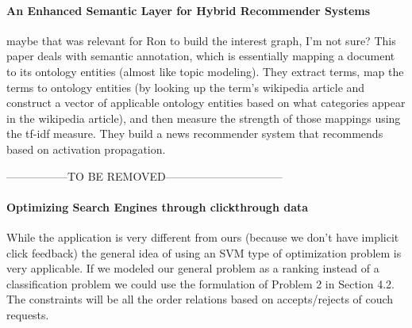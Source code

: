 \paragraph{An Enhanced Semantic Layer for Hybrid Recommender Systems} \cite{Cantador2011}
 maybe that was relevant for Ron to build the interest graph, I'm not sure?
This paper deals with semantic annotation, which is essentially mapping a document to its ontology entities (almost like topic modeling). They extract terms, map the terms to ontology entities (by looking up the term's wikipedia article and construct a vector of applicable ontology entities based on what categories appear in the wikipedia article), and then measure the strength of those mappings using the tf-idf measure.
They build a news recommender system that recommends based on activation propagation.


-----------------TO BE REMOVED--------------------------------

\paragraph{Optimizing Search Engines through clickthrough data} \cite{Joachims2002}
While the application is very different from ours (because we don't have implicit click feedback) the general idea of using an SVM type of optimization problem is very applicable.
If we modeled our general problem as a ranking instead of a classification problem we could use the formulation of Problem 2 in Section 4.2.
The constraints will be all the order relations based on accepts/rejects of couch requests.

